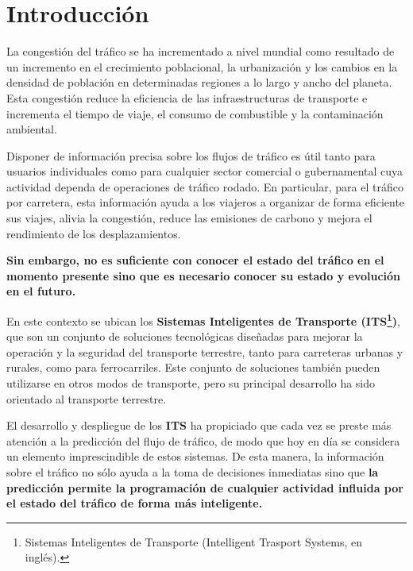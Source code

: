 \documentclass[]{book}
\let\rmarkdownfootnote\footnote%
\def\footnote{\protect\rmarkdownfootnote}
\begin{document}
\mainmatter

{
\hypersetup{linkcolor=black}
\setcounter{tocdepth}{1}
\tableofcontents
}
\listoftables
\listoffigures
\chapter{Introducción}\label{introduccion}

La congestión del tráfico se ha incrementado a nivel mundial como
resultado de un incremento en el crecimiento poblacional, la
urbanización y los cambios en la densidad de población en determinadas
regiones a lo largo y ancho del planeta. Esta congestión reduce la
eficiencia de las infraestructuras de transporte e incrementa el tiempo
de viaje, el consumo de combustible y la contaminación ambiental.

Disponer de información precisa sobre los flujos de tráfico es útil
tanto para usuarios individuales como para cualquier sector comercial o
gubernamental cuya actividad dependa de operaciones de tráfico rodado.
En particular, para el tráfico por carretera, esta información ayuda a
los viajeros a organizar de forma eficiente sus viajes, alivia la
congestión, reduce las emisiones de carbono y mejora el rendimiento de
los desplazamientos.

\textbf{Sin embargo, no es suficiente con conocer el estado del tráfico
en el momento presente sino que es necesario conocer su estado y
evolución en el futuro.}


En este contexto se ubican los \textbf{Sistemas Inteligentes de
Transporte (ITS\footnote{Sistemas Inteligentes de Transporte
  (Intelligent Trasport Systems, en inglés).})}, que son un conjunto de
soluciones tecnológicas diseñadas para mejorar la operación y la
seguridad del transporte terrestre, tanto para carreteras urbanas y
rurales, como para ferrocarriles. Este conjunto de soluciones también
pueden utilizarse en otros modos de transporte, pero su principal
desarrollo ha sido orientado al transporte terrestre.

El desarrollo y despliegue de los \textbf{ITS} ha propiciado que cada
vez se preste más atención a la predicción del flujo de tráfico, de modo
que hoy en día se considera un elemento imprescindible de estos
sistemas. De esta manera, la información sobre el tráfico no sólo ayuda
a la toma de decisiones inmediatas sino que \textbf{la predicción
permite la programación de cualquier actividad influida por el estado
del tráfico de forma más inteligente.}
\end{document}
